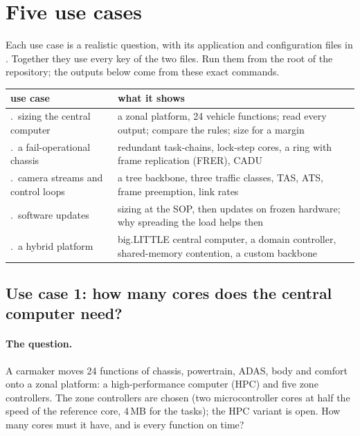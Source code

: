 \section{Five use cases}
\label{sec:usecases}

Each use case is a realistic question, with its application and
configuration files in . Together they use every key of the
two files. Run them from the root of the repository; the outputs below
come from these exact commands.

\begin{center}\small\row
\begin{tabularx}{\textwidth}{@{}>{\raggedright\arraybackslash}p{45mm}X@{}}
\toprule\rowcolor{white}
use case & what it shows \\
\midrule
1.\ sizing the central computer & a zonal platform, 24 vehicle functions; read every output; compare the rules; size for a margin \\
2.\ a fail-operational chassis & redundant task-chains, lock-step cores, a ring with frame replication (FRER), CADU \\
3.\ camera streams and control loops & a tree backbone, three traffic classes, TAS, ATS, frame preemption, link rates \\
4.\ software updates & sizing at the SOP, then updates on frozen hardware; why spreading the load helps then \\
5.\ a hybrid platform & big.LITTLE central computer, a domain controller, shared-memory contention, a custom backbone \\
\bottomrule
\end{tabularx}
\end{center}

\subsection{Use case 1: how many cores does the central computer need?}
\label{sec:uc1}

\paragraph{The question.} A carmaker moves 24 functions of chassis,
powertrain, ADAS, body and comfort onto a zonal platform: a
high-performance computer (HPC) and five zone controllers. The zone
controllers are chosen (two microcontroller cores at half the speed of the
reference core, 4\,MB for the tasks); the HPC variant is open. How many
cores must it have, and is every function on time?

